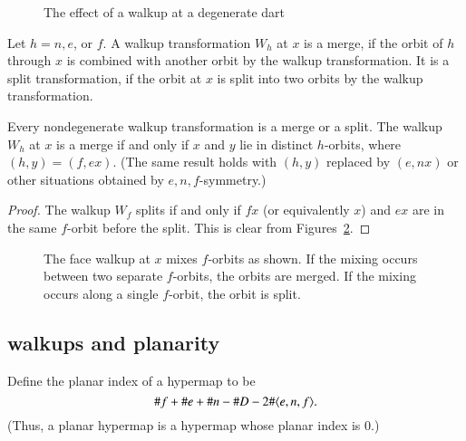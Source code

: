 \begin{figure}[htb]
  \centering
  \caption{The effect of a walkup at a degenerate dart}
  \label{fig:walkdeg}
\end{figure}


\begin{definition}\label{def:merge-split} Let $h=n,e$, or $f$.
A walkup transformation $W_h$ at $x$ is a merge,
if the orbit of $h$ through $x$ is combined with another orbit by
the walkup transformation.  It is a split transformation, if the
orbit at $x$ is split into two orbits by the walkup transformation.
\end{definition}

\begin{lemma}\label{lemma:merge-split} 
Every nondegenerate walkup transformation is a merge or a split.
The walkup $W_h$ at $x$ is a merge if and only if $x$ and $y$  lie
in distinct $h$-orbits, where $(h,y)=(f,e x)$.  
(The same result holds with $(h,y)$
replaced by $(e,n x)$ or other situations obtained by
$e,n,f$-symmetry.)
\end{lemma}

\begin{proof} The walkup $W_f$ splits if and only if $f x$ (or equivalently $x$)
and $e x$ are in the same $f$-orbit before the split. This is clear
from Figures~\ref{fig:split}.
\end{proof}


\begin{figure}[htb]
  \centering
  \caption{The face walkup at $x$ mixes $f$-orbits as shown.  If the mixing
   occurs between two separate $f$-orbits, the orbits are merged.  If the
   mixing occurs along a single $f$-orbit, the orbit is split.}
  \label{fig:split}
\end{figure}


\subsection{walkups and planarity}

\begin{definition} Define the planar index of a hypermap to be
$$\# f + \# e + \# n - \# D - 2\# \langle e,n,f\rangle.$$
(Thus, a planar hypermap is a hypermap whose planar index is $0$.)
\end{definition}

